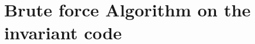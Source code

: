 \documentclass[10pt]{article}
\newcommand{\s}{\vspace{0.3cm}}
\begin{document}
\newpage








\s

\section{Brute force Algorithm on the invariant code}





















\newpage


\end{document}
